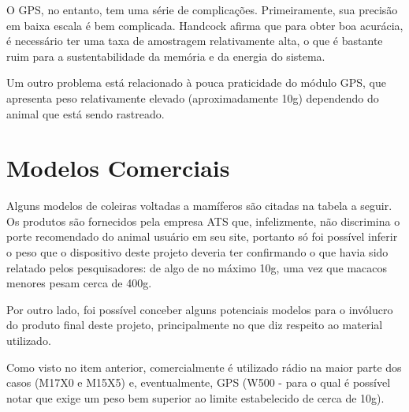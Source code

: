 O GPS, no entanto, tem uma série de complicações. Primeiramente, sua precisão em baixa escala é bem complicada. Handcock afirma que para obter boa acurácia, é necessário ter uma taxa de amostragem relativamente alta, o que é bastante ruim para a sustentabilidade da memória e da energia do sistema.

Um outro problema está relacionado à pouca praticidade do módulo GPS, que apresenta peso relativamente elevado (aproximadamente 10g) dependendo do animal que está sendo rastreado.

\section{Modelos Comerciais}
Alguns modelos de coleiras voltadas a mamíferos são citadas na tabela a seguir. Os produtos são fornecidos pela empresa ATS que, infelizmente, não discrimina o porte recomendado do animal usuário em seu site, portanto só foi possível inferir o peso que o dispositivo deste projeto deveria ter confirmando o que havia sido relatado pelos pesquisadores: de algo de no máximo 10g, uma vez que macacos menores pesam cerca de 400g.

Por outro lado, foi possível conceber alguns potenciais modelos para o invólucro do produto final deste projeto, principalmente no que diz respeito ao material utilizado.

Como visto no item anterior, comercialmente é utilizado rádio na maior parte dos casos (M17X0 e M15X5) e, eventualmente, GPS (W500 - para o qual é possível notar que exige um peso bem superior ao limite estabelecido de cerca de 10g).

